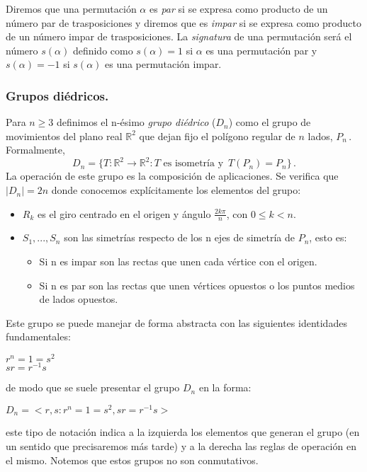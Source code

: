 \begin{ndef}
Diremos que una permutación $\alpha$ es \textit{par} si se expresa como producto de un número par de trasposiciones y diremos que es \textit{impar} si se expresa como producto de un número impar de trasposiciones. La \textit{signatura} de una permutación será el número $s(\alpha)$ definido como $s(\alpha) = 1$ si $\alpha$ es una permutación par y $s(\alpha) = -1$ si $s(\alpha)$ es una permutación impar.
\end{ndef}

\subsubsection{Grupos diédricos.}

Para $n \ge 3$ definimos el n-ésimo \textit{grupo diédrico} ($D_n$) como el grupo de movimientos del plano real $\mathbb{R}^2$ que dejan fijo el polígono regular de $n$ lados, $P_n$\,. Formalmente, \begin{equation*}
  D_n = \{T:\mathbb{R}^2 \to \mathbb{R}^2 : T \text{ es isometría y } \,  T(P_n) = P_n\}\,.
\end{equation*} La operación de este grupo es la composición de aplicaciones. Se verifica que $|D_n| = 2n$ donde conocemos explícitamente los elementos del grupo:
\begin{itemize}
  \item $R_k$ es el giro centrado en el origen y ángulo $\frac{2k\pi}{n}$, con $0 \le k < n$.
  \item $S_1,...,S_n$ son las simetrías respecto de los n ejes de simetría de $P_n$, esto es: \begin{itemize}
    \item Si n es impar son las rectas que unen cada vértice con el origen.
    \item Si n es par son las rectas que unen vértices opuestos o los puntos medios de lados opuestos.
  \end{itemize}
\end{itemize}
  
Este grupo se puede manejar de forma abstracta con las siguientes identidades fundamentales:

$r^n = 1 = s^2$\\
$sr = r^{-1}s$

de modo que se suele presentar el grupo $D_n$ en la forma:

$D_n = <r,s : r^n = 1 = s^2,sr = r^{-1}s>$

este tipo de notación indica a la izquierda los elementos que generan el grupo (en un sentido que precisaremos más tarde) y a la derecha las reglas de operación en el mismo. Notemos que estos grupos no son conmutativos.

